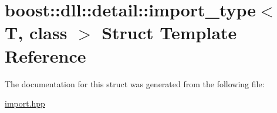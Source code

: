 \hypertarget{a01636}{}\section{boost\+:\+:dll\+:\+:detail\+:\+:import\+\_\+type$<$ T, class $>$ Struct Template Reference}
\label{a01636}


The documentation for this struct was generated from the following file\+:\begin{DoxyCompactItemize}
\item 
\hyperlink{a00254}{import.\+hpp}\end{DoxyCompactItemize}
